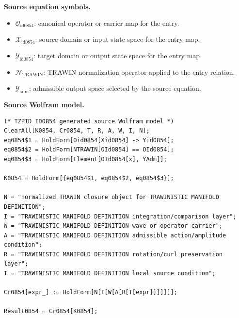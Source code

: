 \begin{minipage}[t]{0.49\linewidth}
\begingroup
\small
\raggedright
\textbf{Source equation symbols.}\par
\begin{itemize}[leftmargin=1.35em,itemsep=1pt,topsep=1pt,parsep=0pt]
    \item $\mathcal{O}_{\mathrm{id0854}}$: canonical operator or carrier map for the entry.
    \item $\mathcal{X}_{\mathrm{id0854}}$: source domain or input state space for the entry map.
    \item $\mathcal{Y}_{\mathrm{id0854}}$: target domain or output state space for the entry map.
    \item $\mathcal{N}_{\mathrm{TRAWIN}}$: TRAWIN normalization operator applied to the entry relation.
    \item $\mathcal{Y}_{\mathrm{adm}}$: admissible output space selected by the source equation.
\end{itemize}
\endgroup
\end{minipage}\hfill
\begin{minipage}[t]{0.47\linewidth}
\begingroup
\scriptsize
\raggedright
\textbf{Source Wolfram model.}\par
\begin{Verbatim}[fontsize=\tiny,breaklines=true,breakanywhere=true]
(* TZPID ID0854 generated source Wolfram model *)
ClearAll[K0854, Cr0854, T, R, A, W, I, N];
eq0854$1 = HoldForm[Oid0854[Xid0854] -> Yid0854];
eq0854$2 = HoldForm[NTRAWIN[OId0854] == OId0854];
eq0854$3 = HoldForm[Element[OId0854[x], YAdm]];

K0854 = HoldForm[{eq0854$1, eq0854$2, eq0854$3}];

N = "normalized TRAWIN closure object for TRAWINISTIC MANIFOLD DEFINITION";
I = "TRAWINISTIC MANIFOLD DEFINITION integration/comparison layer";
W = "TRAWINISTIC MANIFOLD DEFINITION wave or operator carrier";
A = "TRAWINISTIC MANIFOLD DEFINITION admissible action/amplitude condition";
R = "TRAWINISTIC MANIFOLD DEFINITION rotation/curl preservation layer";
T = "TRAWINISTIC MANIFOLD DEFINITION local source condition";

Cr0854[expr_] := HoldForm[N[I[W[A[R[T[expr]]]]]]];

Result0854 = Cr0854[K0854];
\end{Verbatim}
\endgroup
\end{minipage}


